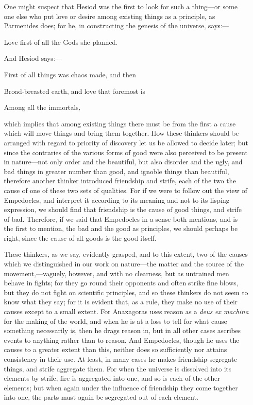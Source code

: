 
One might suspect that Hesiod was the first to look for such a thing—or some one else who put love or desire among existing things as a principle, as Parmenides does; for he, in constructing the genesis of the universe, says:—

Love first of all the Gods she planned.

And Hesiod says:—

First of all things was chaos made, and then

Broad-breasted earth, and love that foremost is

Among all the immortals,

which implies that among existing things there must be from the first a cause which will move things and bring them together. How these thinkers should be arranged with regard to priority of discovery let us be allowed to decide later; but since the contraries of the various forms of good were also perceived to be present in nature—not only order and the beautiful, but also disorder and the ugly, and bad things in greater number than good, and ignoble things than beautiful, therefore another thinker introduced friendship and strife, each of the two the cause of one of these two sets of qualities. For if we were to follow out the view of Empedocles, and interpret it according to its meaning and not to its lisping expression, we should find that friendship is the cause of good things, and strife of bad. Therefore, if we said that Empedocles in a sense both mentions, and is the first to mention, the bad and the good as principles, we should perhaps be right, since the cause of all goods is the good itself.

These thinkers, as we say, evidently grasped, and to this extent, two of the causes which we distinguished in our work on nature—the matter and the source of the movement,—vaguely, however, and with no clearness, but as untrained men behave in fights; for they go round their opponents and often strike fine blows, but they do not fight on scientific principles, and so these thinkers do not seem to know what they say; for it is evident that, as a rule, they make no use of their causes except to a small extent. For Anaxagoras uses reason as a \emph{deus ex machina} for the making of the world, and when he is at a loss to tell for what cause something necessarily is, then he drags reason in, but in all other cases ascribes events to anything rather than to reason. And Empedocles, though he uses the causes to a greater extent than this, neither does so sufficiently nor attains consistency in their use. At least, in many cases he makes friendship segregate things, and strife aggregate them. For when the universe is dissolved into its elements by strife, fire is aggregated into one, and so is each of the other elements; but when again under the influence of friendship they come together into one, the parts must again be segregated out of each element.

